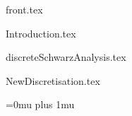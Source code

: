 \documentclass[draft,a4paper,twoside,openany,final,12pt,table]{book}
\begin{document}

\newcommand{\currentlabel}{}
\let\oldlabel\label
\renewcommand{\label}[1]{\oldlabel{#1}\renewcommand{\currentlabel}{#1}}

\newcommand{\currentlabelchapter}{}
\newcommand{\labelchapter}[1]{\label{#1}\renewcommand{\currentlabelchapter}{#1}}


\newcommand{\mySub}[2]{{\noindent\bf#2}\tabto*{#1}}


\sloppy %

{front.tex}

\mainmatter
{Introduction.tex}

{discreteSchwarzAnalysis.tex}

{NewDiscretisation.tex}


\backmatter
\clearpage
{}
{}
\Urlmuskip=0mu plus 1mu\relax


\end{document}
